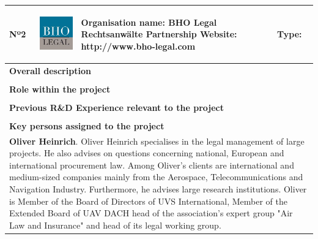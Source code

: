 \begin{longtable}[H]{|p{0.7cm}|p{4cm}|p{7cm}|p{1.3cm}|}
	\hline
	\begin{center} Nº2 \end{center} & \begin{center} \includegraphics[scale=0.4]{./logos/BHO-logo} \end{center} & \begin{center} \textbf{Organisation name:} BHO Legal Rechtsanwälte Partnership \newline \textbf{Website:} http://www.bho-legal.com \end{center} & \begin{center} Type: \end{center} \\ \hline
	
	\multicolumn{4}{|p{13cm}|}{\textbf{Overall description}}  \\ \hline
	
	\multicolumn{4}{|p{13cm}|}{}  \\ \hline
	
	\multicolumn{4}{|p{13cm}|}{\textbf{Role within the project}}   \\ \hline
	
	\multicolumn{4}{|p{13cm}|}{}  \\ \hline
	
	\multicolumn{4}{|p{13cm}|}{\textbf{Previous R\&D Experience relevant to the project}}  \\ \hline
	
	\multicolumn{4}{|p{13cm}|}{}  \\ \hline
	
	\multicolumn{4}{|p{13cm}|}{\textbf{Key persons assigned to the project}}   \\ \hline
	
	\multicolumn{4}{|p{13cm}|}{\textbf{Oliver Heinrich}. Oliver Heinrich specialises in the legal management of large projects. He also advises on questions concerning national, European and international procurement law. Among Oliver's clients are international and medium-sized companies mainly from the Aerospace, Telecommunications and Navigation Industry. Furthermore, he advises large research institutions. Oliver is Member of the Board of Directors of UVS International, Member of the Extended Board of UAV DACH head of the association’s expert group "Air Law and Insurance" and head of its legal working group.}  \\ \hline
	

\end{longtable}
